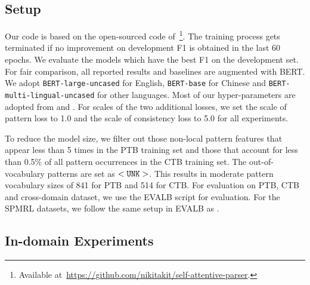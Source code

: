 \documentclass[11pt]{article}
\begin{document}
\subsection{Setup}
Our code is based on the open-sourced code of~\citet{san-constituency}\footnote{Available at~\url{https://github.com/nikitakit/self-attentive-parser}.}. 
The training process gets terminated if no improvement on development F1 is obtained in the last 60 epochs. 
We evaluate the models which have the best F1 on the development set. 
For fair comparison, all reported results and baselines are augmented with BERT. We adopt {\tt BERT-large-uncased} for English, {\tt BERT-base} for Chinese and {\tt BERT-multi-lingual-uncased} for other languages.
Most of our hyper-parameters are adopted from \citet{san-constituency} and \citet{cross-domain-parser}. 
For scales of the two additional losses, we set the scale of pattern loss to 1.0 and the scale of consistency loss to 5.0 for all experiments. 

To reduce the model size, we filter out those non-local pattern features that appear less than 5 times in the PTB training set and  those that account for less than 0.5\% of all pattern occurrences in the CTB training set. The out-of-vocabulary patterns are set as ${\tt <UNK>}$.
This results in moderate pattern vocabulary sizes of 841 for PTB and 514 for CTB. 
For evaluation on PTB, CTB and cross-domain dataset, we use the EVALB script for evaluation.
For the SPMRL datasets, we follow the same setup in EVALB as \citet{san-constituency}.



\subsection{In-domain Experiments}
\end{document}
